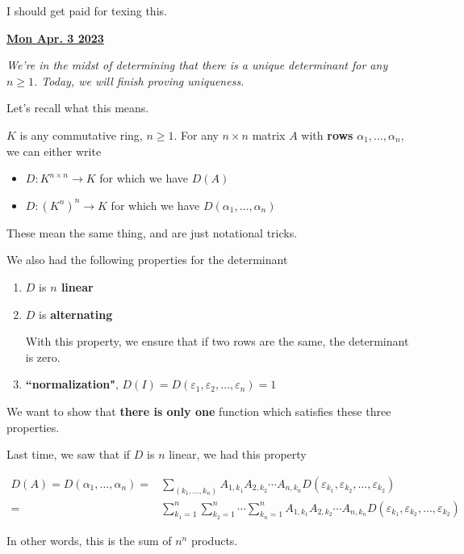 \documentclass[12pt]{article}
\renewcommand{\date}[1]{\underline{\bf #1}}
\def\eps{\varepsilon}
\begin{document}
  I should get paid for texing this.



  \date{Mon Apr. 3 2023}

  {\it We're in the midst of determining that there is a unique determinant for
  any $n \ge 1$. Today, we will finish proving uniqueness.}

  Let's recall what this means.

  $K$ is any commutative ring, $n \ge 1$. For any $n \times n$ matrix $A$ with
  {\bf rows} $\alpha_1, \dots, \alpha_n$, we can either write 

  \begin{itemize}
    \item $D: K^{n \times n} \to K$ for which we have $D(A)$
    \item $D: (K^n)^n \to K$ for which we have $D(\alpha_1, \dots, \alpha_n)$
  \end{itemize}

  These mean the same thing, and are just notational tricks.

  We also had the following properties for the determinant

  \begin{enumerate}
    \item $D$ is {\bf $n$ linear}
    \item $D$ is {\bf alternating}

      With this property, we ensure that if two rows are the same, the
      determinant is zero.

    \item {\bf ``normalization"}, $D(I) = D(\eps_1, \eps_2, \dots, \eps_n) = 1$ 
  \end{enumerate}

  We want to show that {\bf there is only one} function which satisfies these
  three properties.

  Last time, we saw that if $D$ is $n$ linear, we had this property

  \begin{align*}
    D(A) = D(\alpha_1, \dots, \alpha_n) =& \sum_{(k_1, \dots, k_n)} A_{1, k_1} A_{2, k_2} \cdots A_{n, k_n} D(\eps_{k_1}, \eps_{k_2}, \dots, \eps_{k_2}) \\
    =& \sum_{k_1 = 1}^n \sum_{k_2 = 1}^n \cdots \sum_{k_n = 1}^n A_{1, k_1} A_{2, k_2} \cdots A_{n, k_n} D(\eps_{k_1}, \eps_{k_2}, \dots, \eps_{k_2})
  \end{align*}

  In other words, this is the sum of $n^n$ products.
\end{document}
